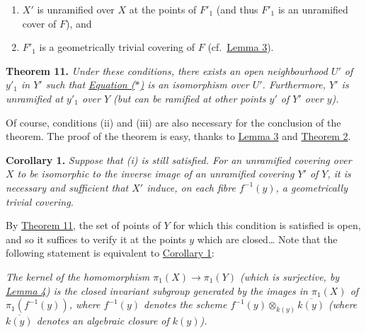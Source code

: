 \documentclass{article}
\providecommand{\tightlist}{%
  \setlength{\itemsep}{0pt}\setlength{\parskip}{0pt}}
\newenvironment{itenv}[1]
  {\phantomsection\par\smallskip\noindent\textbf{#1.}\itshape}
  {\par\smallskip}
\newcommand{\oldpage}[1]{\marginpar{\footnotesize$\Big\vert$ \textit{p.~#1}}}
\theoremstyle{definition}
\theoremstyle{definition}
\theoremstyle{definition}
\theoremstyle{definition}
\theoremstyle{remark}
\begin{document}
\begin{enumerate}
\def\labelenumi{\roman{enumi}.}
\setcounter{enumi}{1}
\tightlist
\item
  \(X'\) is unramified over \(X\) at the points of \(F'_1\) (and thus \(F'_1\) is an unramified cover of \(F\)), and
\item
  \(F'_1\) is a geometrically trivial covering of \(F\) (cf.~\protect\hyperlink{fga-2-lemma-3}{Lemma 3}).
\end{enumerate}

\leavevmode{}%
\begin{itenv}{Theorem 11}
Under these conditions, there exists an open neighbourhood \(U'\) of \(y'_1\) in \(Y'\) such that \protect\hyperlink{fga-2-equation-asterisk}{Equation (\(*\))} is an isomorphism over \(U'\).
\oldpage{182-22}Furthermore, \(Y'\) is unramified at \(y'_1\) over \(Y\) (but can be ramified at other points \(y'\) of \(Y'\) over \(y\)).

\end{itenv}

Of course, conditions (ii) and (iii) are also necessary for the conclusion of the theorem.
The proof of the theorem is easy, thanks to \protect\hyperlink{fga-2-lemma-3}{Lemma 3} and \protect\hyperlink{fga-2-theorem-2}{Theorem 2}.

\leavevmode{}%
\begin{itenv}{Corollary 1}
Suppose that (i) is still satisfied.
For an unramified covering over \(X\) to be isomorphic to the inverse image of an unramified covering \(Y'\) of \(Y\), it is necessary and sufficient that \(X'\) induce, on each fibre \(f^{-1}(y)\), a geometrically trivial covering.

\end{itenv}

By \protect\hyperlink{fga-2-theorem-11}{Theorem 11}, the set of points of \(Y\) for which this condition is satisfied is open, and so it suffices to verify it at the points \(y\) which are closed\ldots{}
Note that the following statement is equivalent to \protect\hyperlink{fga-2-theorem-11-corollary-1}{Corollary 1}:

\emph{The kernel of the homomorphism \(\pi_1(X)\to\pi_1(Y)\) (which is surjective, by \protect\hyperlink{fga-2-lemma-4}{Lemma 4}) is the closed invariant subgroup generated by the images in \(\pi_1(X)\) of \(\pi_1(f^{-1}(y))\), where \(f^{-1}(y)\) denotes the scheme \(f^{-1}(y)\otimes_{k(y)}\overline{k(y)}\) (where \(\overline{k(y)}\) denotes an algebraic closure of \(k(y)\)).}
\end{document}
